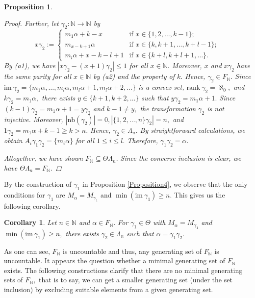 \documentclass[11pt]{article}
\theoremstyle{plain}
\newtheorem{proposition}[theorem]{Proposition}
\newtheorem{corollary}[theorem]{Corollary}
\theoremstyle{definition}
\newcommand{\rank}{\mathrm{rank~}}
\newcommand{\im}{\mathrm{im~}}
\newcommand{\nb}{\mathrm{nb}}
\begin{document}
\begin{proposition}
\begin{proof}
Further, let $\gamma_{2}:\mathbb{N}\to\mathbb{N}$ by
$$x\gamma_{2}:=\begin{cases}
m_{1}\alpha+k-x&\text{if }x\in\{1,2,\ldots,k-1\};\\
m_{x-k+1}\alpha~~&\text{if }x\in\{k,k+1,\ldots,k+l-1\};\\
m_{l}\alpha+x-k-l+1&\text{if }x\in\{k+l,k+l+1,\ldots\}.
\end{cases}$$
By (a1), we have $\left\vert x\gamma_{2}-(x+1)\gamma_{2}\right\vert\leq 1$ for all $x\in\mathbb{N}.$ Moreover, $x$ and $x\gamma_{2}$ have the same parity for all $x\in\mathbb{N}$ by (a2) and the property of $k.$ Hence, $\gamma_{2}\in F_{\mathbb{N}}.$ Since $\im\gamma_{2}=\{m_{1}\alpha,\ldots,m_{l}\alpha,m_{l}\alpha+1,m_{l}\alpha+2,\ldots\}$ is a convex set, $\rank\gamma_{2}=\aleph_{0},$ and $k\gamma_{2}=m_{1}\alpha,$ there exists $y\in\{k+1,k+2,\ldots\}$ such that $y\gamma_{2}=m_{1}\alpha+1.$ Since $(k-1)\gamma_{2}=m_{1}\alpha+1=y\gamma_{2}$ and $k-1\not=y,$ the transformation $\gamma_{2}$ is not injective. Moreover, $\left\vert \nb(\gamma_{2})\right\vert=0,\left\vert\{1,2,\ldots, n\}\gamma_{2}\right\vert=n,$ and $1\gamma_{2}=m_{1}\alpha+k-1\geq k> n.$ Hence, $\gamma_{2}\in\Lambda_{n}.$ 
By straightforward calculations, we obtain $A_{i}\gamma_{1}\gamma_{2}=\{m_{i}\alpha\}$ for all $1\leq i\leq l.$ Therefore, $\gamma_{1}\gamma_{2}=\alpha.$

Altogether, we have shown $F_{\mathbb{N}}\subseteq\Theta\Lambda_{n}.$ Since the converse inclusion is clear, we have $\Theta\Lambda_{n}=F_{\mathbb{N}}.$
\end{proof}
\end{proposition}
By the construction of $\gamma_{1}$ in Proposition \ref{Proposition4}, we observe that the only conditions for $\gamma_{1}$ are $M_{\alpha}=M_{\gamma_{1}}$ and $\min(\im \gamma_{1})\geq n.$ This gives us the following corollary.
\begin{corollary}\label{Corollary5}
Let $n\in\mathbb{N}$ and $\alpha\in F_{\mathbb{N}}.$ For $\gamma_{1}\in\Theta$ with $M_{\alpha}=M_{\gamma_{1}}$ and $\min(\im \gamma_{1})\geq n,$ there exists $\gamma_{2}\in\Lambda_{n}$ such that $\alpha=\gamma_{1}\gamma_{2}.$
\end{corollary}

As one can see, $F_{\mathbb{N}}$ is uncountable and thus, any generating set of $F_{\mathbb{N}}$ is uncountable. It appears the question whether a minimal generating set of $F_{\mathbb{N}}$ exists. The following constructions clarify that there are no minimal generating sets of $F_{\mathbb{N}},$ that is to say, we can get a smaller generating set (under the set inclusion) by excluding suitable elements from a given generating set. 
\end{document}
